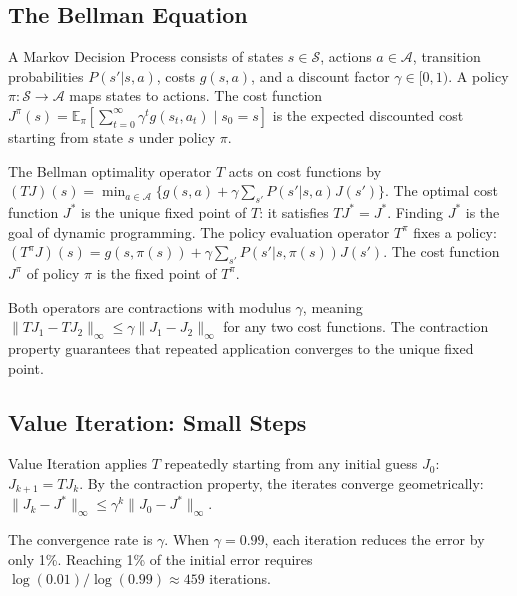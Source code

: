 
\subsection{The Bellman Equation}
\label{sec:bellman}

A Markov Decision Process consists of states $s \in \mathcal{S}$, actions $a \in \mathcal{A}$, transition probabilities $P(s'|s,a)$, costs $g(s,a)$, and a discount factor $\gamma \in [0,1)$. A policy $\pi: \mathcal{S} \to \mathcal{A}$ maps states to actions. The cost function $J^\pi(s) = \mathbb{E}_\pi[\sum_{t=0}^{\infty} \gamma^t g(s_t, a_t) \mid s_0 = s]$ is the expected discounted cost starting from state $s$ under policy $\pi$.

The Bellman optimality operator $T$ acts on cost functions by $(TJ)(s) = \min_{a \in \mathcal{A}} \{ g(s,a) + \gamma \sum_{s'} P(s'|s,a) J(s') \}$. The optimal cost function $J^*$ is the unique fixed point of $T$: it satisfies $TJ^* = J^*$. Finding $J^*$ is the goal of dynamic programming. The policy evaluation operator $T^\pi$ fixes a policy: $(T^\pi J)(s) = g(s,\pi(s)) + \gamma \sum_{s'} P(s'|s,\pi(s)) J(s')$. The cost function $J^\pi$ of policy $\pi$ is the fixed point of $T^\pi$.

Both operators are contractions with modulus $\gamma$, meaning $\|TJ_1 - TJ_2\|_\infty \leq \gamma \|J_1 - J_2\|_\infty$ for any two cost functions. The contraction property guarantees that repeated application converges to the unique fixed point.


\subsection{Value Iteration: Small Steps}
\label{sec:vi}

Value Iteration applies $T$ repeatedly starting from any initial guess $J_0$: $J_{k+1} = TJ_k$. By the contraction property, the iterates converge geometrically: $\|J_k - J^*\|_\infty \leq \gamma^k \|J_0 - J^*\|_\infty$.

The convergence rate is $\gamma$. When $\gamma = 0.99$, each iteration reduces the error by only 1\%. Reaching 1\% of the initial error requires $\log(0.01)/\log(0.99) \approx 459$ iterations.

